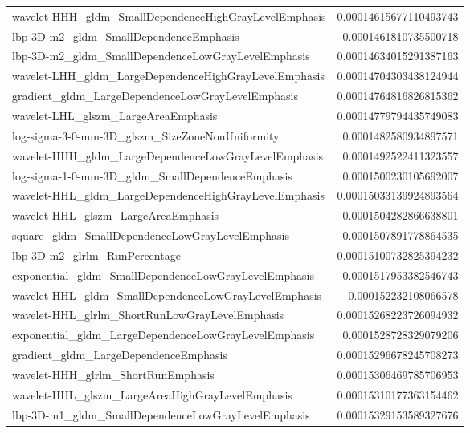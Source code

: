 {\begin{xltabular}[H]{\textwidth}{X r}
        wavelet-HHH\_gldm\_SmallDependenceHighGrayLevelEmphasis & 0.00014615677110493743 \\
        lbp-3D-m2\_gldm\_SmallDependenceEmphasis & 0.0001461810735500718 \\
        lbp-3D-m2\_gldm\_SmallDependenceLowGrayLevelEmphasis & 0.00014634015291387163 \\
        wavelet-LHH\_gldm\_LargeDependenceHighGrayLevelEmphasis & 0.00014704303438124944 \\
        gradient\_gldm\_LargeDependenceLowGrayLevelEmphasis & 0.00014764816826815362 \\
        wavelet-LHL\_glszm\_LargeAreaEmphasis & 0.00014779794435749083 \\
        log-sigma-3-0-mm-3D\_glszm\_SizeZoneNonUniformity & 0.0001482580934897571 \\
        wavelet-HHH\_gldm\_LargeDependenceLowGrayLevelEmphasis & 0.0001492522411323557 \\
        log-sigma-1-0-mm-3D\_gldm\_SmallDependenceEmphasis & 0.0001500230105692007 \\
        wavelet-HHL\_gldm\_LargeDependenceHighGrayLevelEmphasis & 0.00015033139924893564 \\
        wavelet-HHL\_glszm\_LargeAreaEmphasis & 0.0001504282866638801 \\
        square\_gldm\_SmallDependenceLowGrayLevelEmphasis & 0.0001507891778864535 \\
        lbp-3D-m2\_glrlm\_RunPercentage & 0.00015100732825394232 \\
        exponential\_gldm\_SmallDependenceLowGrayLevelEmphasis & 0.0001517953382546743 \\
        wavelet-HHL\_gldm\_SmallDependenceLowGrayLevelEmphasis & 0.000152232108066578 \\
        wavelet-HHL\_glrlm\_ShortRunLowGrayLevelEmphasis & 0.00015268223726094932 \\
        exponential\_gldm\_LargeDependenceLowGrayLevelEmphasis & 0.0001528728329079206 \\
        gradient\_gldm\_LargeDependenceEmphasis & 0.00015296678245708273 \\
        wavelet-HHH\_glrlm\_ShortRunEmphasis & 0.00015306469785706953 \\
        wavelet-HHL\_glszm\_LargeAreaHighGrayLevelEmphasis & 0.00015310177363154462 \\
        lbp-3D-m1\_gldm\_SmallDependenceLowGrayLevelEmphasis & 0.00015329153589327676 \\

\end{xltabular}}
